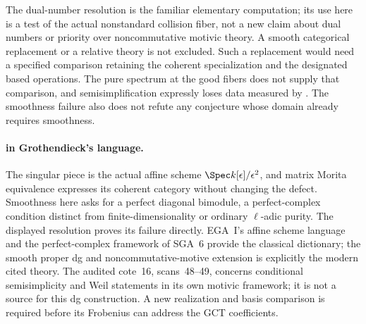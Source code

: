 The dual-number resolution is the familiar elementary computation;
its use here is a test of the actual nonstandard collision fiber,
not a new claim about dual numbers or priority over noncommutative
motivic theory. A smooth categorical replacement or a relative theory
is not excluded. Such a replacement would need a specified comparison
retaining the coherent specialization and the designated based
operations. The pure spectrum at the good fibers does not supply
that comparison, and semisimplification expressly loses data measured
by . The smoothness failure also does not refute any
conjecture whose domain already requires smoothness.

\paragraph{ in Grothendieck's language.}
The singular piece is the actual affine scheme
$\Spec k[\epsilon]/\epsilon^2$, and matrix Morita equivalence
expresses its coherent category without changing the defect.
Smoothness here asks for a perfect diagonal bimodule, a perfect-complex
condition distinct from finite-dimensionality or ordinary $\ell$-adic
purity. The displayed resolution proves its failure directly. EGA~I's
affine scheme language and the perfect-complex framework of SGA~6
provide the classical dictionary; the smooth proper dg and
noncommutative-motive extension is explicitly the modern cited theory.
The audited cote~16, scans~48--49, concerns conditional semisimplicity
and Weil statements in its own motivic framework; it is not a source
for this dg construction. A new realization and basis comparison is
required before its Frobenius can address the GCT coefficients.
